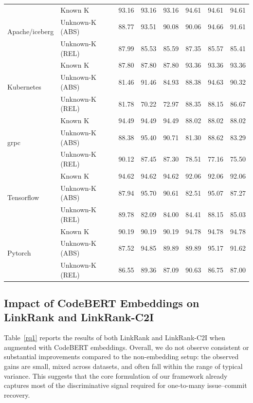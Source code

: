 \begin{table}[htbp]
\begin{tabular}{@{}llcccccc@{}}
\multirow{3}{*}{Apache/iceberg}
 & Known K           & 93.16 & 93.16 & 93.16 & 94.61 & 94.61 & 94.61 \\
 & Unknown-K (ABS)   & 88.77 & 93.51 & 90.08 & 90.06 & 94.66 & 91.61 \\
 & Unknown-K (REL)   & 87.99 & 85.53 & 85.59 & 87.35 & 85.57 & 85.41 \\
\midrule

\multirow{3}{*}{Kubernetes}
 & Known K           & 87.80 & 87.80 & 87.80 & 93.36 & 93.36 & 93.36 \\
 & Unknown-K (ABS)   & 81.46 & 91.46 & 84.93 & 88.38 & 94.63 & 90.32 \\
 & Unknown-K (REL)   & 81.78 & 70.22 & 72.97 & 88.35 & 88.15 & 86.67 \\
\midrule

\multirow{3}{*}{grpc}
 & Known K           & 94.49 & 94.49 & 94.49 & 88.02 & 88.02 & 88.02 \\
 & Unknown-K (ABS)   & 88.38 & 95.40 & 90.71 & 81.30 & 88.62 & 83.29 \\
 & Unknown-K (REL)   & 90.12 & 87.45 & 87.30 & 78.51 & 77.16 & 75.50 \\
\midrule

\multirow{3}{*}{Tensorflow}
 & Known K           & 94.62 & 94.62 & 94.62 & 92.06 & 92.06 & 92.06 \\
 & Unknown-K (ABS)   & 87.94 & 95.70 & 90.61 & 82.51 & 95.07 & 87.27 \\
 & Unknown-K (REL)   & 89.78 & 82.09 & 84.00 & 84.41 & 88.15 & 85.03 \\
\midrule

\multirow{3}{*}{Pytorch}
 & Known K           & 90.19 & 90.19 & 90.19 & 94.78 & 94.78 & 94.78 \\
 & Unknown-K (ABS)   & 87.52 & 94.85 & 89.89 & 89.89 & 95.17 & 91.62 \\
 & Unknown-K (REL)   & 86.55 & 89.36 & 87.09 & 90.63 & 86.75 & 87.00 \\
\bottomrule
\end{tabular}
\end{table}

\newpage
\subsection{Impact of CodeBERT Embeddings on LinkRank and LinkRank-C2I}

Table~\ref{rq1} reports the results of both LinkRank and LinkRank-C2I when augmented with CodeBERT embeddings. Overall, we do not observe consistent or substantial improvements compared to the non-embedding setup: the observed gains are small, mixed across datasets, and often fall within the range of typical variance. This suggests that the core formulation of our framework already captures most of the discriminative signal required for one-to-many issue--commit recovery.

